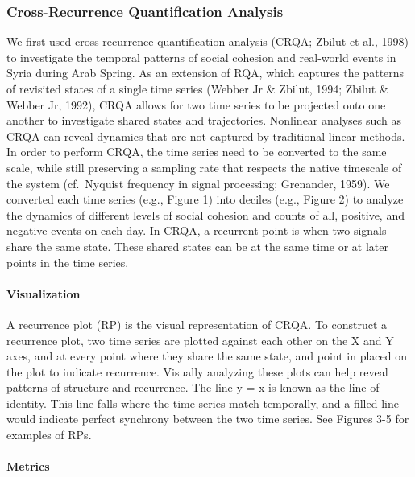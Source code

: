 \documentclass[english,man]{apa6}
\begin{document}
\hypertarget{cross-recurrence-quantification-analysis}{%
\subsubsection{Cross-Recurrence Quantification Analysis}\label{cross-recurrence-quantification-analysis}}

We first used cross-recurrence quantification analysis (CRQA; Zbilut et al., 1998) to investigate the temporal patterns of social cohesion and real-world events in Syria during Arab Spring. As an extension of RQA, which captures the patterns of revisited states of a single time series (Webber Jr \& Zbilut, 1994; Zbilut \& Webber Jr, 1992), CRQA allows for two time series to be projected onto one another to investigate shared states and trajectories. Nonlinear analyses such as CRQA can reveal dynamics that are not captured by traditional linear methods. In order to perform CRQA, the time series need to be converted to the same scale, while still preserving a sampling rate that respects the native timescale of the system (cf.~Nyquist frequency in signal processing; Grenander, 1959). We converted each time series (e.g., Figure 1) into deciles (e.g., Figure 2) to analyze the dynamics of different levels of social cohesion and counts of all, positive, and negative events on each day. In CRQA, a recurrent point is when two signals share the same state. These shared states can be at the same time or at later points in the time series.

\hypertarget{visualization}{%
\paragraph{Visualization}\label{visualization}}

A recurrence plot (RP) is the visual representation of CRQA. To construct a recurrence plot, two time series are plotted against each other on the X and Y axes, and at every point where they share the same state, and point in placed on the plot to indicate recurrence. Visually analyzing these plots can help reveal patterns of structure and recurrence. The line y = x is known as the line of identity. This line falls where the time series match temporally, and a filled line would indicate perfect synchrony between the two time series. See Figures 3-5 for examples of RPs.

\hypertarget{metrics}{%
\paragraph{Metrics}\label{metrics}}
\end{document}
